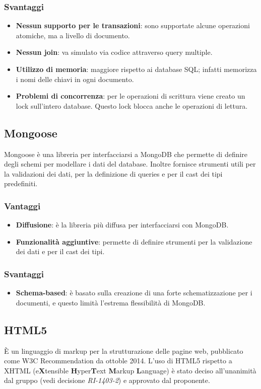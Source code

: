 \subsubsection{Svantaggi}
\begin{itemize}
\item \textbf{Nessun supporto per le transazioni}: sono supportate alcune operazioni atomiche, ma a livello di documento.
\item \textbf{Nessun join}: va simulato via codice attraverso query multiple.
\item \textbf{Utilizzo di memoria}: maggiore rispetto ai database SQL; infatti memorizza i nomi delle chiavi in ogni documento. 
\item \textbf{Problemi di concorrenza}: per le operazioni di scrittura viene creato un lock sull'intero database. Questo lock blocca anche le operazioni di lettura.
\end{itemize}
\subsection{Mongoose}
Mongoose \`e una libreria per interfacciarsi a MongoDB che permette di definire degli schemi per modellare i dati del database. Inoltre fornisce strumenti utili per la validazioni dei dati, per la definizione di queries e per il cast dei tipi predefiniti. \\
\subsubsection{Vantaggi}
\begin{itemize}
\item \textbf{Diffusione}: \`e la libreria pi\`u diffusa per interfacciarsi con MongoDB.
\item \textbf{Funzionalit\`a aggiuntive}: permette di definire strumenti per la validazione dei dati e per il cast dei tipi.
\end{itemize}
\subsubsection{Svantaggi}
\begin{itemize}
\item \textbf{Schema-based}: \`e basato sulla creazione di una forte schematizzazione per i documenti, e questo limità l'estrema flessibilità di MongoDB.
\end{itemize}
\subsection{HTML5}
\`E un linguaggio di markup per la strutturazione delle pagine web, pubblicato come W3C Recommendation da ottoble 2014. L'uso di HTML5 rispetto a XHTML (e\textbf{X}tensible \textbf{H}yper\textbf{T}ext \textbf{M}arkup \textbf{L}anguage) \`e stato deciso all'unanimit\`a dal gruppo (vedi decisione \textit{RI-1403-2}) e approvato dal proponente.
